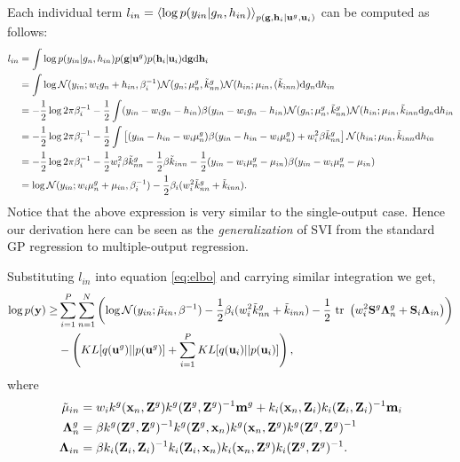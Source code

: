 \documentclass{article} %
\begin{document}
\noindent Each individual term $l_{in} = \left\langle \log p(y_{in} | g_n, h_{in}) \right\rangle_{p(\mathbf{g},\mathbf{h}_i | \mathbf{u}^g, \mathbf{u}_i)}$ can be computed as follows:
\begin{align}
\nonumber
l_{in} &= \int \log p(y_{in} | g_n, h_{in}) p(\mathbf{g} | \mathbf{u}^g) p(\mathbf{h}_i | \mathbf{u}_i) \mathrm{d} \mathbf{g} \mathrm{d} \mathbf{h}_i \\
\nonumber
&= \int \log \mathcal{N}(y_{in} ; w_i g_n + h_{in}, \beta_i^{-1}) 
\mathcal{N}(g_n ; \mu^g_n, \tilde{k}^g_{nn})
\mathcal{N}(h_{in} ; \mu_{in}, (\tilde{k}_{inn}) \mathrm{d} g_n \mathrm{d} h_{in} \\
\nonumber
&= -\frac{1}{2} \log 2 \pi \beta_i^{-1} - \frac{1}{2} \int (y_{in} - w_i g_n - h_{in}) \beta (y_{in} - w_i g_n - h_{in})
\mathcal{N}(g_n ; \mu^g_n, \tilde{k}^g_{nn})
\mathcal{N}(h_{in} ; \mu_{in}, \tilde{k}_{inn} \mathrm{d} g_n \mathrm{d} h_{in} \\
\nonumber
&= -\frac{1}{2} \log 2 \pi \beta_i^{-1} - \frac{1}{2} \int \left[(y_{in} - h_{in} - w_i \mu^g_n) \beta (y_{in} - h_{in} - w_i \mu^g_n) + w_i^2 \beta \tilde{k}^g_{nn} \right] 
\mathcal{N}(h_{in} ; \mu_{in}, \tilde{k}_{inn} \mathrm{d} h_{in} \\
\nonumber
&= -\frac{1}{2} \log 2 \pi \beta_i^{-1} - \frac{1}{2} w_i^2 \beta \tilde{k}^g_{nn}
- \frac{1}{2} \beta \tilde{k}_{inn} - \frac{1}{2} (y_{in} - w_i \mu^g_n - \mu_{in}) \beta (y_{in} - w_i \mu^g_n - \mu_{in}) \\
&= \log \mathcal{N}(y_{in}; w_i \mu^g_n + \mu_{in}, \beta_i^{-1})  - \frac{1}{2} \beta_i (w_i^2 \tilde{k}^g_{nn} + \tilde{k}_{inn}).
\end{align}
Notice that the above expression is very similar to the single-output case.
Hence our derivation here can be seen as the \textit{generalization} of SVI from the standard GP regression to multiple-output regression.

\noindent Substituting $l_{in}$ into equation \ref{eq:elbo} and carrying similar integration we get,
\begin{align}
\log p(\mathbf{y})
\ge& \sum_{i=1}^P \sum_{n=1}^N
 \left( \log \mathcal{N}(y_{in}; \tilde{\mu}_{in}, \beta^{-1})
         - \frac{1}{2} \beta_i (w_i^2 \tilde{k}^g_{nn} + \tilde{k}_{inn})
         - \frac{1}{2} \mbox{ \rm tr } \left( w_i^2 \mathbf{S}^g \mathbf{\Lambda}^g_n + \mathbf{S}_i \mathbf{\Lambda}_{in} \right)
\right) \\
&- \left( KL[q(\mathbf{u}^g) || p(\mathbf{u}^g)] + \sum_{i=1}^P KL[q(\mathbf{u}_i) || p(\mathbf{u}_i)] \right),
\end{align}
where 
\begin{align}
\tilde{\mu}_{in}
&= w_i k^g(\mathbf{x}_n, \mathbf{Z}^g)k^g(\mathbf{Z}^g,\mathbf{Z}^g)^{-1}\mathbf{m}^g + k_i(\mathbf{x}_n, \mathbf{Z}_i)k_i(\mathbf{Z}_i,\mathbf{Z}_i)^{-1}\mathbf{m}_i \\
\mathbf{\Lambda}^g_n
&= \beta k^g(\mathbf{Z}^g,\mathbf{Z}^g)^{-1} k^g(\mathbf{Z}^g, \mathbf{x}_n) k^g(\mathbf{x}_n, \mathbf{Z}^g) k^g(\mathbf{Z}^g,\mathbf{Z}^g)^{-1} \\
\mathbf{\Lambda}_{in}
&= \beta k_i(\mathbf{Z}_i,\mathbf{Z}_i)^{-1} k_i(\mathbf{Z}_i, \mathbf{x}_n) k_i(\mathbf{x}_n, \mathbf{Z}^g) k_i(\mathbf{Z}^g,\mathbf{Z}^g)^{-1}.
\end{align}
\end{document}
